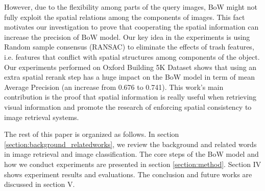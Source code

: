 However, due to the flexibility among parts of the query images, BoW might not fully exploit the spatial relations among the components of images. This fact motivates our investigation to prove that cooperating the spatial information can increase the precision of BoW model. Our key idea in the experiments is using Random sample consensus (RANSAC) to eliminate the effects of trash features, i.e. features that conflict with spatial structures among components of the object. Our experiments performed on Oxford Building 5K Dataset shows that using an extra spatial rerank step has a huge impact on the BoW model in term of mean Average Precision (an increase from 0.676 to 0.741). This work's main contribution is the proof that spatial information is really useful when retrieving visual information and promote the research of enforcing spatial consistency to image retrieval systems.

The rest of this paper is organized as follows. In section \ref{section:background_relatedworks}, we review the background and related words in image retrieval and image classification. The core steps of the BoW model and how we conduct experiments are presented in section \ref{section:method}. Section IV shows experiment results and evaluations. The conclusion and future works are discussed in section V.
